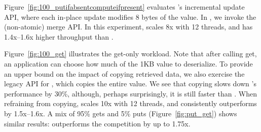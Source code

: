 Figure~\ref{fig:100_putifabsentcomputeifpresent} evaluates \oak's incremental update API, 
where each in-place update modifies 8 bytes of the value. 
In \csl, we invoke the (non-atomic) merge API.
In this experiment, 
\oak\/ scales 8x with 12 threads, and has 1.4x--1.6x higher throughput than \csl. 

Figure~\ref{fig:100_get} illustrates the get-only workload. Note that after calling get, an application can 
choose how much of the 1KB value to deserialize.  
To provide an upper bound on the impact of copying retrieved data, we also exercise the legacy API for \oak, which
copies the entire value.  We see that copying slows down \oak's performance by 30\%,
although, perhaps surprisingly, it is still faster than \csl. 
When refraining from copying, \oak\/ scales 10x with 12 threads, and consistently outperforms \csl\/ by 1.5x--1.6x.  
A mix of 95\% gets and 5\% puts (Figure~\ref{fig:put_get}) 
shows similar results: \oak\/ outperforms the competition by up to 1.75x.

